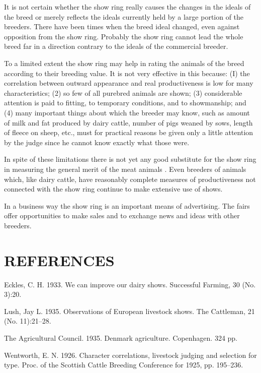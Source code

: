 It is not certain whether the show ring really causes the changes in
the ideals of the breed or merely reflects the ideals currently held by
a large portion of the breeders. There have been times when the breed
ideal changed, even against opposition from the show ring. Probably
the show ring cannot lead the whole breed far in a direction contrary to
the ideals of the commercial breeder.

To a limited extent the show ring may help in rating the animals
of the breed according to their breeding value. It is not very effective in
this because: (I) the correlation between outward appearance and real
productiveness is low for many characteristics; (2) so few of all purebred
animals are shown; (3) considerable attention is paid to fitting, to
temporary conditions, and to showmanship; and (4) many important
things about which the breeder may know, such as amount of milk and
fat produced by dairy cattle, number of pigs weaned by sows, length of
fleece on sheep, etc., must for practical reasons be given only a little
attention by the judge since he cannot know exactly what those were.

In spite of these limitations there is not yet any good substitute for
the show ring in measuring the general merit of the meat animals . Even
breeders of animals which, like dairy cattle, have reasonably complete
measures of productiveness not connected with the show ring continue
to make extensive use of shows.

In a business way the show ring is an important means of advertising.
The fairs offer opportunities to make sales and to exchange news
and ideas with other breeders.

\section*{REFERENCES}

\begin{hangparas}{0.5in}{1}%
Eckles, C. H. 1933. We can improve our dairy shows. Successful Farming,
30 (No. 3):20.

Lush, Jay L. 1935. Observations of European livestock shows. The Cattleman,
21 (No. 11):21--28.

The Agricultural Council. 1935. Denmark agriculture. Copenhagen. 324 pp.

Wentworth, E. N. 1926. Character correlations, livestock judging and selection for
type. Proc. of the Scottish Cattle Breeding Conference for 1925, pp. 195--236.
\end{hangparas}
